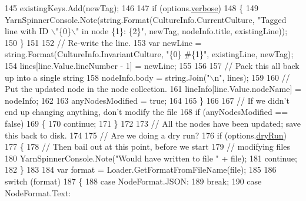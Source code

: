 \begin{DoxyCode}
145                     existingKeys.Add(newTag);
146 
147                     \textcolor{keywordflow}{if} (options.\hyperlink{a00043_ada4d83d1756918f362d55f6649b82b17}{verbose})
148                     \{
149                         YarnSpinnerConsole.Note(string.Format(CultureInfo.CurrentCulture, \textcolor{stringliteral}{"Tagged line with
       ID \(\backslash\)"\{0\}\(\backslash\)" in node \{1\}: \{2\}"}, newTag, nodeInfo.title, existingLine));
150                     \}
151 
152                     \textcolor{comment}{// Re-write the line.}
153                     var newLine = string.Format(CultureInfo.InvariantCulture, \textcolor{stringliteral}{"\{0\} #\{1\}"}, existingLine, 
      newTag);
154                     lines[line.Value.lineNumber - 1] = newLine;
155 
156 
157                     \textcolor{comment}{// Pack this all back up into a single string}
158                     nodeInfo.body = string.Join(\textcolor{stringliteral}{"\(\backslash\)n"}, lines);
159 
160                     \textcolor{comment}{// Put the updated node in the node collection.}
161                     lineInfo[line.Value.nodeName] = nodeInfo;
162 
163                     anyNodesModified = \textcolor{keyword}{true};
164 
165                 \}
166 
167                 \textcolor{comment}{// If we didn't end up changing anything, don't modify the file}
168                 \textcolor{keywordflow}{if} (anyNodesModified == \textcolor{keyword}{false})
169                 \{
170                     \textcolor{keywordflow}{continue};
171                 \}
172 
173                 \textcolor{comment}{// All the nodes have been updated; save this back to disk.}
174 
175                 \textcolor{comment}{// Are we doing a dry run?}
176                 \textcolor{keywordflow}{if} (options.\hyperlink{a00039_a5dc9d9db767738237e988f95fc0330f4}{dryRun})
177                 \{
178                     \textcolor{comment}{// Then bail out at this point, before we start}
179                     \textcolor{comment}{// modifying files}
180                     YarnSpinnerConsole.Note(\textcolor{stringliteral}{"Would have written to file "} + file);
181                     \textcolor{keywordflow}{continue};
182                 \}
183 
184                 var format = Loader.GetFormatFromFileName(file);
185 
186                 \textcolor{keywordflow}{switch} (format)
187                 \{
188                     \textcolor{keywordflow}{case} NodeFormat.JSON:
189                         \textcolor{keywordflow}{break};
190                     \textcolor{keywordflow}{case} NodeFormat.Text:

\end{DoxyCode}
